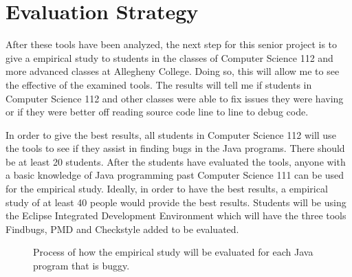 
\vspace*{-.2in}
\section{Evaluation Strategy}
\label{sec:evaluate}
\vspace*{-.1in}

After these tools have been analyzed, the next step for this senior project is  to give a empirical study to students in the classes of Computer Science 112 and more advanced classes at Allegheny College. Doing so, this will allow me to see the effective of the examined tools. The results will tell me if students in Computer Science 112 and other classes were able to fix issues they were having or if they were better off reading source code line to line to debug code.  

In order to give the best results, all students in Computer Science 112 will use the tools to see if they assist in finding  bugs in the Java programs. There should be at least 20 students. After the students have evaluated the tools, anyone with a basic knowledge of Java programming past Computer Science 111 can be used for the empirical study. Ideally, in order to have the best results, a empirical study of at least 40 people would provide the best results. Students will be using the Eclipse Integrated Development Environment which will have the three tools Findbugs, PMD and Checkstyle added to be evaluated. 
\newpage
\begin{figure}
   \caption{Process of how the empirical study will be evaluated for each Java program that is buggy.}
   \label{fig:fcoes}%
\end{figure}

